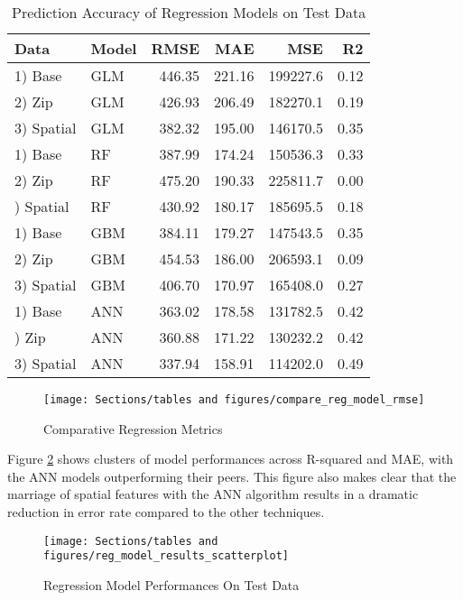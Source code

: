 \documentclass[12pt,]{article}
\begin{document}
\begin{table}

\caption{\label{tab:Reg Model RMSE Compare}\label{tab:RegModelTable} Prediction Accuracy of Regression Models on Test Data}
\centering
\begin{tabular}[t]{llrrrr}
\toprule
Data & Model & RMSE & MAE & MSE & R2\\
\midrule
1) Base & GLM & 446.35 & 221.16 & 199227.6 & 0.12\\
2) Zip & GLM & 426.93 & 206.49 & 182270.1 & 0.19\\
3) Spatial & GLM & 382.32 & 195.00 & 146170.5 & 0.35\\
1) Base & RF & 387.99 & 174.24 & 150536.3 & 0.33\\
2) Zip & RF & 475.20 & 190.33 & 225811.7 & 0.00\\
\addlinespace
3) Spatial & RF & 430.92 & 180.17 & 185695.5 & 0.18\\
1) Base & GBM & 384.11 & 179.27 & 147543.5 & 0.35\\
2) Zip & GBM & 454.53 & 186.00 & 206593.1 & 0.09\\
3) Spatial & GBM & 406.70 & 170.97 & 165408.0 & 0.27\\
1) Base & ANN & 363.02 & 178.58 & 131782.5 & 0.42\\
\addlinespace
2) Zip & ANN & 360.88 & 171.22 & 130232.2 & 0.42\\
3) Spatial & ANN & 337.94 & 158.91 & 114202.0 & 0.49\\
\bottomrule
\end{tabular}
\end{table}

\begin{figure}[H]
\texttt{[image: Sections/tables and figures/compare\_reg\_model\_rmse]} \caption{Comparative Regression Metrics}\label{fig:Model RMSE Comparrison}
\end{figure}

\noindent Figure \ref{fig:reg Models Scatterplot} shows clusters of
model performances across R-squared and MAE, with the ANN models
outperforming their peers. This figure also makes clear that the
marriage of spatial features with the ANN algorithm results in a
dramatic reduction in error rate compared to the other techniques.

\begin{figure}[H]
\texttt{[image: Sections/tables and figures/reg\_model\_results\_scatterplot]} \caption{Regression Model Performances On Test Data}\label{fig:reg Models Scatterplot}
\end{figure}
\end{document}
